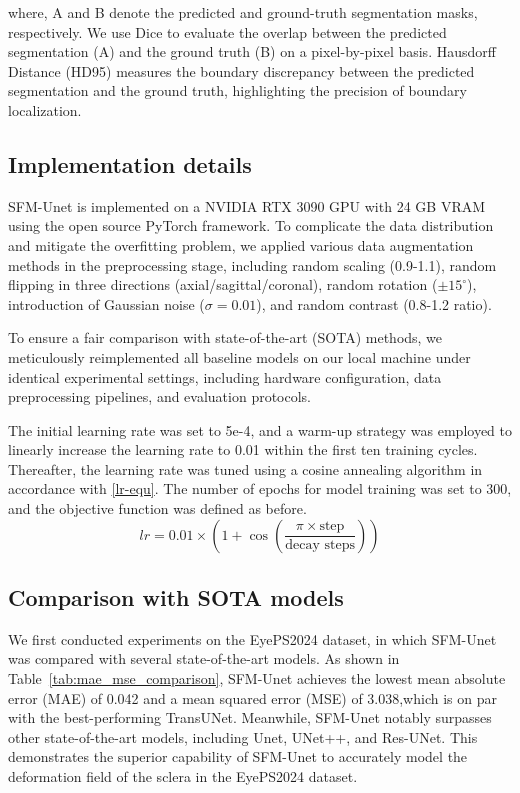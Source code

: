 \documentclass[AMA,Times1COL]{WileyNJDv5} %
\begin{document}
where, A and B denote the predicted and ground-truth segmentation masks, respectively. We use Dice to evaluate the overlap between the predicted segmentation (A) and the ground truth (B) on a pixel-by-pixel basis. Hausdorff Distance (HD95) measures the boundary discrepancy between the predicted segmentation and the ground truth, highlighting the precision of boundary localization.

\subsection{Implementation details}
SFM-Unet is implemented on a NVIDIA RTX 3090 GPU with 24 GB VRAM using the open source PyTorch framework. To complicate the data distribution and mitigate the overfitting problem, we applied various data augmentation methods in the preprocessing stage, including random scaling (0.9-1.1), random flipping in three directions (axial/sagittal/coronal), random rotation ($\pm 15^\circ$), introduction of Gaussian noise ($\sigma = 0.01$), and random contrast (0.8-1.2 ratio). 

To ensure a fair comparison with state-of-the-art (SOTA) methods, we meticulously reimplemented all baseline models on our local machine under identical experimental settings, including hardware configuration, data preprocessing pipelines, and evaluation protocols. 

The initial learning rate was set to 5e-4, and a warm-up strategy was employed to linearly increase the learning rate to 0.01 within the first ten training cycles. Thereafter, the learning rate was tuned using a cosine annealing algorithm in accordance with \eqref{lr-equ}. The number of epochs for model training was set to 300, and the objective function was defined as before.
\begin{equation}
    \label{lr-equ}
    lr = 0.01 \times \left(1 + \cos\left(\frac{\pi \times \text{step}}{\text{decay steps}}\right)\right)
\end{equation}

\subsection{Comparison with SOTA models}
We first conducted experiments on the EyePS2024 dataset, in which SFM-Unet was compared with several state-of-the-art models. As shown in Table~\ref{tab:mae_mse_comparison}, SFM-Unet achieves the lowest mean absolute error (MAE) of 0.042 and a mean squared error (MSE) of 3.038,which is on par with the best-performing TransUNet. Meanwhile, SFM-Unet notably surpasses other state-of-the-art models, including Unet, UNet++, and Res-UNet. This demonstrates the superior capability of SFM-Unet to accurately model the deformation field of the sclera in the EyePS2024 dataset.
\end{document}
